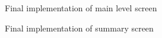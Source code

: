 \documentclass{l4proj}
\begin{document}
\begin{appendices}
\begin{figure}[H]
    \caption{Final implementation of main level screen}
    \label{fig:email_final}
\end{figure}

\begin{figure}[H]
    \caption{Final implementation of summary screen}
    \label{fig:summary_final}
\end{figure}

\end{appendices}






\end{document}
